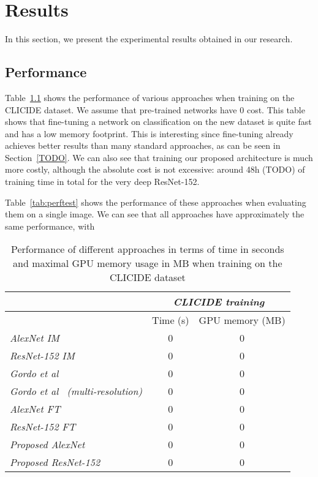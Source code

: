 
\chapter{Results}
In this section, we present the experimental results obtained in our
research.

\section{Performance}\label{sec:perfresults}
Table~\ref{tab:perftrain} shows the performance of various approaches
when training on the CLICIDE dataset. We assume that pre-trained
networks have 0 cost. This table shows that fine-tuning a network
on classification on the new dataset is quite fast and has a low memory
footprint. This is interesting since fine-tuning already achieves better
results than many standard approaches, as can be seen in
Section~\ref{TODO}.
We can also see that training our proposed architecture is much
more costly, although the absolute cost is not excessive:
around 48h (TODO) of training time in total for the very deep ResNet-152.

Table~\ref{tab:perftest} shows the performance of these approaches
when evaluating them on a single image. We can see that all approaches
have approximately the same performance, with %

\begin{table}
\begin{tabular}{|l|c|c|}
\hline & \multicolumn{2}{c|}{\emph{CLICIDE training}}\\
\hline & Time (s) & GPU memory (MB)\\
\hline \emph{AlexNet IM} & 0 & 0\\
\hline \emph{ResNet-152 IM} & 0 & 0\\
\hline \emph{Gordo et al~\cite{gordo_deep_2016}} & 0 & 0\\
\hline \emph{Gordo et al~\cite{gordo_deep_2016} (multi-resolution)}
& 0 & 0\\
\hline \emph{AlexNet FT} & 0 & 0\\ %
\hline \emph{ResNet-152 FT} & 0 & 0\\
\hline \emph{Proposed AlexNet} & 0 & 0\\ %
\hline \emph{Proposed ResNet-152} & 0 & 0\\
\hline
\end{tabular}
\caption{Performance of different approaches in terms of time in seconds and
maximal GPU memory usage in MB when training on the CLICIDE dataset
\label{tab:perftrain}}
\end{table}

